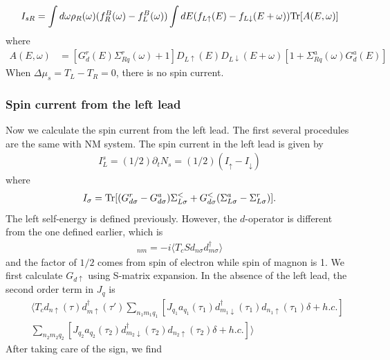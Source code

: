 \documentclass[aps,prb,superscriptaddress]{revtex4-2}
\begin{document}
\begin{eqnarray}
I_{sR} = \int d\omega \rho_R(\omega) (f^B_R(\omega)-f^B_L(\omega))\int dE (f_{L\uparrow}(E)-f_{L\downarrow}(E+\omega)) {\rm Tr}[A(E,\omega)] \label{spin4}
\end{eqnarray}
where
\begin{eqnarray}
A(E,\omega)&=[G^r_{d}(E)\Sigma^r_{Rq}(\omega) +1 ] D_{L\uparrow}(E) D_{L\downarrow}(E+\omega) [1+ \Sigma^a_{Rq}(\omega) G^a_{d}(E)]
\end{eqnarray}
When $\Delta \mu_s = T_L - T_R = 0$, there is no spin current.%

\subsubsection{Spin current from the left lead}
Now we calculate the spin current from the left lead. The first several procedules are the same with NM system. The spin current in the left lead is given by
\begin{eqnarray}
I_L^s = (1/2) \partial_t N_s = (1/2)(I_{\uparrow}-I_{\downarrow}) \nonumber
\end{eqnarray}
where
\begin{eqnarray}
I_\sigma = {\rm Tr} [(G_{d\sigma}^r-G_{d\sigma}^a)\Sigma^<_{L\sigma} +G_{d\sigma}^< (\Sigma_{L\sigma}^a -\Sigma_{L\sigma}^r)]. \nonumber
\end{eqnarray}
The left self-energy is defined previously. However, the $d$-operator is different from the one defined earlier, which is
\begin{eqnarray}
[G_{d\sigma}]_{nm} = -i\langle T_c S d_{n\sigma} d^\dagger_{m\sigma}\rangle \nonumber
\end{eqnarray}
and the factor of $1/2$ comes from spin of electron while spin of magnon is 1. We first calculate $G_{d\uparrow}$ using S-matrix expansion. In the absence of the left lead, the second order term in $J_q$ is
\begin{eqnarray}
&&\langle T_c d_{n\uparrow}(\tau) d^{\dagger}_{m\uparrow}(\tau') \sum_{n_1 m_1 q_1}[J_{q_1} a_{q_1}(\tau_1) d^{\dagger}_{m_1\downarrow}(\tau_1) d_{n_1\uparrow}(\tau_1)\delta +h.c.]\nonumber \\
&&\sum_{n_2 m_2 q_2}[J_{q_2} a_{q_2}(\tau_2) d^{\dagger}_{m_2\downarrow}(\tau_2) d_{n_2\uparrow}(\tau_2)\delta +h.c.]\rangle \nonumber
\end{eqnarray}
After taking care of the sign, we find
\end{document}
